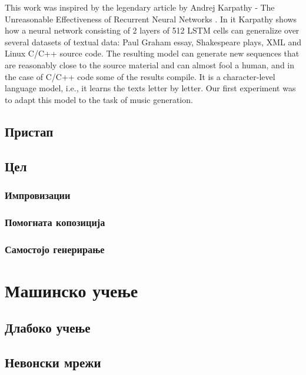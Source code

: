 This work was inspired by the legendary article by Andrej Karpathy - The Unreasonable Effectiveness of Recurrent Neural Networks \cite{AndrejKarpathy2015}. In it Karpathy shows how a neural network consisting of 2 layers of 512 LSTM cells can generalize over several datasets of textual data: Paul Graham essay, Shakespeare plays, XML and Linux C/C++ source code. The resulting model can generate new sequences that are reasonably close to the source material and can almost fool a human, and in the case of C/C++ code some of the results compile. It is a character-level language model, i.e., it learns the texts letter by letter. Our first experiment was to adapt this model to the task of music generation.


\section{Пристап}
\section{Цел}
\subsection{Импровизации} 
\subsection{Помогната копозиција} 
\subsection{Самостојо генерирање} 

\chapter{Машинско учење}

\section{Длабоко учење}

\section{Невонски мрежи}

